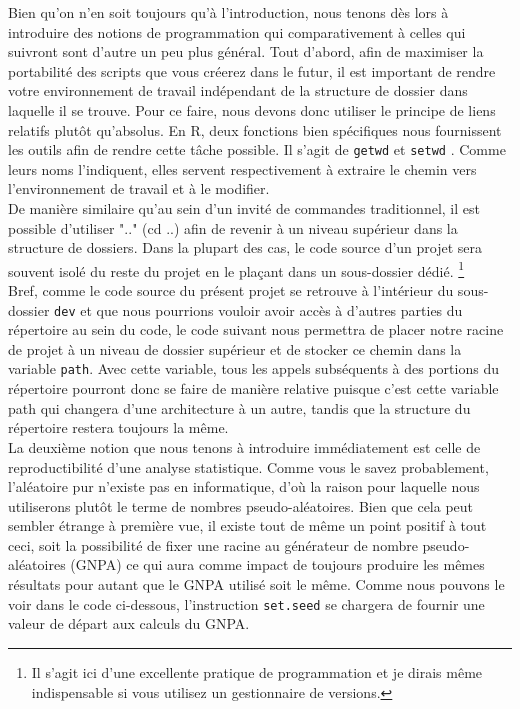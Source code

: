 Bien qu'on n'en soit toujours qu'à l'introduction, nous tenons dès lors à introduire des notions de programmation qui comparativement à celles qui suivront sont d'autre un peu plus général. Tout d'abord, afin de maximiser la portabilité des scripts que vous créerez dans le futur, il est important de rendre votre environnement de travail indépendant de la structure de dossier dans laquelle il se trouve. Pour ce faire, nous devons donc utiliser le principe de liens relatifs plutôt qu'absolus. En R, deux fonctions bien spécifiques nous fournissent les outils afin de rendre cette tâche possible. Il s'agit de \texttt{getwd} et \texttt{setwd} \cite{Rfunction:setwd}. Comme leurs noms l'indiquent, elles servent respectivement à extraire le chemin vers l'environnement de travail et à le modifier. \\

De manière similaire qu'au sein d'un invité de commandes traditionnel, il est possible d'utiliser ".." (cd ..) afin de revenir à un niveau supérieur dans la structure de dossiers. Dans la plupart des cas, le code source d'un projet sera souvent isolé du reste du projet en le plaçant dans un sous-dossier dédié. \footnote{Il s'agit ici d'une excellente pratique de programmation et je dirais même indispensable si vous utilisez un gestionnaire de versions.} \\

Bref, comme le code source du présent projet se retrouve à l'intérieur du sous-dossier \texttt{dev} \cite{repo:RAQ} et que nous pourrions vouloir avoir accès à d'autres parties du répertoire au sein du code, le code suivant nous permettra de placer notre racine de projet à un niveau de dossier supérieur et de stocker ce chemin dans la variable \texttt{path}. Avec cette variable, tous les appels subséquents à des portions du répertoire pourront donc se faire de manière relative puisque c'est cette variable path qui changera d'une architecture à un autre, tandis que la structure du répertoire restera toujours la même. \\

La deuxième notion que nous tenons à introduire immédiatement est celle de reproductibilité d'une analyse statistique. Comme vous le savez probablement, l'aléatoire pur n'existe pas en informatique, d'où la raison pour laquelle nous utiliserons plutôt le terme de nombres pseudo-aléatoires. Bien que cela peut sembler étrange à première vue, il existe tout de même un point positif à tout ceci, soit la possibilité de fixer une racine au générateur de nombre pseudo-aléatoires (GNPA) ce qui aura comme impact de toujours produire les mêmes résultats pour autant que le GNPA utilisé soit le même. Comme nous pouvons le voir dans le code ci-dessous, l'instruction \texttt{set.seed} \cite{Rfunction:setseed} se chargera de fournir une valeur de départ aux calculs du GNPA. \\

